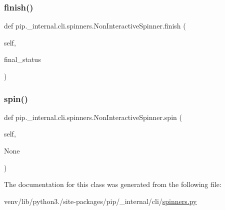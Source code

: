 \subsubsection{\texorpdfstring{finish()}{finish()}}
{\footnotesize\ttfamily def pip.\+\_\+internal.\+cli.\+spinners.\+Non\+Interactive\+Spinner.\+finish (\begin{DoxyParamCaption}\item[{}]{self,  }\item[{}]{final\+\_\+status }\end{DoxyParamCaption})}

\mbox{\label{classpip_1_1__internal_1_1cli_1_1spinners_1_1NonInteractiveSpinner_a817d93ef2de4fa9539257a2c5e7724c5}} 
\subsubsection{\texorpdfstring{spin()}{spin()}}
{\footnotesize\ttfamily def pip.\+\_\+internal.\+cli.\+spinners.\+Non\+Interactive\+Spinner.\+spin (\begin{DoxyParamCaption}\item[{}]{self,  }\item[{}]{None }\end{DoxyParamCaption})}



The documentation for this class was generated from the following file\+:\begin{DoxyCompactItemize}
\item 
venv/lib/python3./site-\/packages/pip/\+\_\+internal/cli/\hyperlink{spinners_8py}{spinners.\+py}\end{DoxyCompactItemize}
